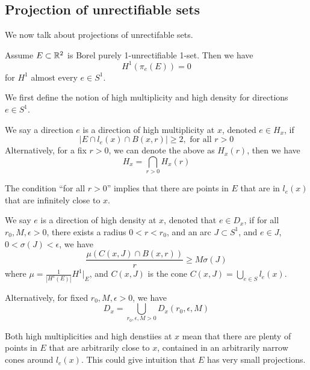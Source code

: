 \subsection{Projection of unrectifiable sets}
We now talk about projections of unrectifable sets. 
\begin{theorem}[Besicovitch]
    Assume $E\subset \mathbb{R}^2$ is Borel purely 1-unrectifiable 1-set. Then we have 
    \begin{equation*}
        H^1(\pi_e(E))=0
    \end{equation*}
    for $H^1$ almost every $e\in S^1$.
\end{theorem}
We first define the notion of high multiplicity and high density for directions $e\in S^1$.

\begin{definition}
    We say a direction $e$ is a direction of high multiplicity at $x$, denoted $e\in H_x$, if
    \begin{equation*}
        |E\cap l_e(x)\cap B(x,r)|\geq 2, \text{ for all } r>0
    \end{equation*}
    Alternatively, for a fix $r>0$, we can denote the above as $H_x(r)$, then we have
    \begin{equation*}
        H_x=\bigcap_{r>0}H_x(r)
    \end{equation*}
\end{definition}
The condition ``for all $r>0$'' implies that there are points in $E$ that are in $l_e(x)$ that are infinitely close to $x$.

\begin{definition}
    We say $e$ is a direction of high density at $x$, denoted that $e\in D_x$, if for all $r_0, M, \epsilon>0$, there exists a radius $0<r<r_0$, and an arc $J\subset S^1$, and $e\in J$, $0<\sigma(J)<\epsilon$, we have
    \begin{equation*}
        \frac{\mu(C(x,J)\cap B(x,r))}{r}\geq M\sigma(J)
    \end{equation*}
    where $\mu=\frac{1}{|H^s(E)|}H^1\vert_E$, and $C(x, J)$ is the cone $C(x,J)=\bigcup_{e\in S}l_e(x)$.

    Alternatively, for fixed $r_0, M, \epsilon>0$, we have
    \begin{equation*}
        D_x=\bigcup_{r_0, \epsilon, M>0}D_x(r_0,\epsilon, M)
    \end{equation*}
\end{definition}
\begin{note}
    Both high multiplicities and high denstiies at $x$ mean that there are plenty of points in $E$ that are arbitrarily close to $x$, contained in an arbitrarily narrow cones around $l_e(x)$. This could give intuition that $E$ has very small projections.
\end{note}

